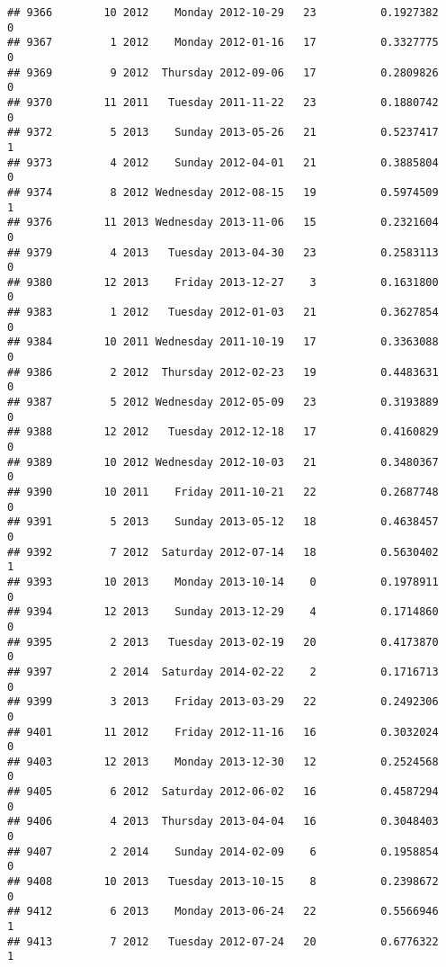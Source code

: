 \documentclass[
]{article}
\begin{document}
\begin{verbatim}
## 9366        10 2012    Monday 2012-10-29   23          0.1927382             0
## 9367         1 2012    Monday 2012-01-16   17          0.3327775             0
## 9369         9 2012  Thursday 2012-09-06   17          0.2809826             0
## 9370        11 2011   Tuesday 2011-11-22   23          0.1880742             0
## 9372         5 2013    Sunday 2013-05-26   21          0.5237417             1
## 9373         4 2012    Sunday 2012-04-01   21          0.3885804             0
## 9374         8 2012 Wednesday 2012-08-15   19          0.5974509             1
## 9376        11 2013 Wednesday 2013-11-06   15          0.2321604             0
## 9379         4 2013   Tuesday 2013-04-30   23          0.2583113             0
## 9380        12 2013    Friday 2013-12-27    3          0.1631800             0
## 9383         1 2012   Tuesday 2012-01-03   21          0.3627854             0
## 9384        10 2011 Wednesday 2011-10-19   17          0.3363088             0
## 9386         2 2012  Thursday 2012-02-23   19          0.4483631             0
## 9387         5 2012 Wednesday 2012-05-09   23          0.3193889             0
## 9388        12 2012   Tuesday 2012-12-18   17          0.4160829             0
## 9389        10 2012 Wednesday 2012-10-03   21          0.3480367             0
## 9390        10 2011    Friday 2011-10-21   22          0.2687748             0
## 9391         5 2013    Sunday 2013-05-12   18          0.4638457             0
## 9392         7 2012  Saturday 2012-07-14   18          0.5630402             1
## 9393        10 2013    Monday 2013-10-14    0          0.1978911             0
## 9394        12 2013    Sunday 2013-12-29    4          0.1714860             0
## 9395         2 2013   Tuesday 2013-02-19   20          0.4173870             0
## 9397         2 2014  Saturday 2014-02-22    2          0.1716713             0
## 9399         3 2013    Friday 2013-03-29   22          0.2492306             0
## 9401        11 2012    Friday 2012-11-16   16          0.3032024             0
## 9403        12 2013    Monday 2013-12-30   12          0.2524568             0
## 9405         6 2012  Saturday 2012-06-02   16          0.4587294             0
## 9406         4 2013  Thursday 2013-04-04   16          0.3048403             0
## 9407         2 2014    Sunday 2014-02-09    6          0.1958854             0
## 9408        10 2013   Tuesday 2013-10-15    8          0.2398672             0
## 9412         6 2013    Monday 2013-06-24   22          0.5566946             1
## 9413         7 2012   Tuesday 2012-07-24   20          0.6776322             1

\end{verbatim}
\end{document}

